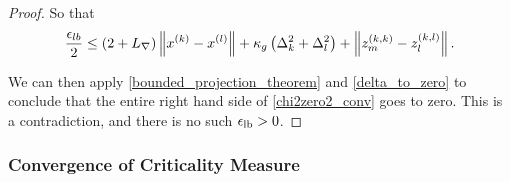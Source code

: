 \begin{proof}



So that
\begin{align}
\frac{\epsilon_{lb}} 2 \le \left(2 + {L_{\nabla}}\right) \left\|x^{(k)} - {x^{(l)}}\right\| 
+ \kappa_g \left(\Delta_k^2 + \Delta_l^2\right)
+ \left\|{z_m^{(k, k)}} - {z_l^{(k, l)}}\right\|
\label{chi2zero2_conv}.
\end{align}

We can then apply \cref{bounded_projection_theorem} and \cref{delta_to_zero} to conclude that the entire right hand side of \cref{chi2zero2_conv} goes to zero.
This is a contradiction, and there is no such ${\epsilon_{\textrm{lb}}} > 0$.
\end{proof}

\subsubsection{Convergence of Criticality Measure}
\label{limit_of_true_criticallity}


